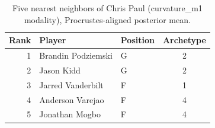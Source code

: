 \begin{table}[htbp]
  \centering\small
  \begin{tabular}{rllc}
    \toprule
    Rank & Player & Position & Archetype \\
    \midrule
    1 & Brandin Podziemski & G & 2 \\
    2 & Jason Kidd & G & 2 \\
    3 & Jarred Vanderbilt & F & 1 \\
    4 & Anderson Varejao & F & 4 \\
    5 & Jonathan Mogbo & F & 4 \\
    \bottomrule
  \end{tabular}
  \caption{Five nearest neighbors of Chris Paul (curvature_m1 modality), Procrustes-aligned posterior mean.}
  \label{tab:Chris_Paul_neighbors_curvature_m1}
\end{table}

